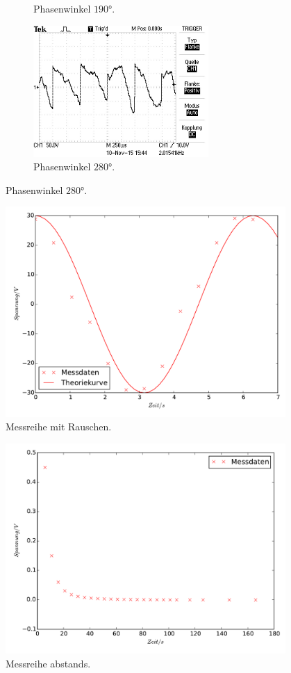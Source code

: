 \begin{figure}
\begin{subfigure}{0.48\textwidth}
\caption{Phasenwinkel $190°$.}
\label{fig:rp190}
\end{subfigure}
\begin{subfigure}{0.48\textwidth}
\centering
\includegraphics[height=5cm]{Bilder/r/r280.JPG}
\caption{Phasenwinkel $280°$.}
\label{fig:rp280}
\end{subfigure}
\end{figure}
\begin{figure}
  \centering
  \includegraphics[height=8cm]{r_signal.pdf}
  \caption{Messreihe mit Rauschen.}
  \label{fig:Mr}
\end{figure}


\begin{figure}
  \centering
  \includegraphics[height=8cm]{LED.pdf}
  \caption{Messreihe abstands.}
  \label{fig:LED}
\end{figure}
